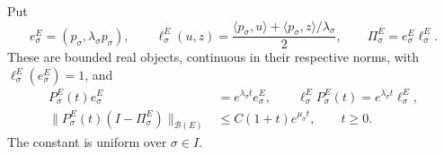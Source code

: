 \begin{proposition}
  \label{P:compact-E-wave}
  Put
  \[
    e_\sigma^E=(p_\sigma,\lambda_\sigma p_\sigma),\qquad
    \ell_\sigma^E(u,z)
    =\frac{\langle p_\sigma,u\rangle+
    \langle p_\sigma,z\rangle/\lambda_\sigma}{2},
    \qquad \Pi_\sigma^E=e_\sigma^E\ell_\sigma^E.
  \]
  These are bounded real objects, continuous in their respective norms,
  with $\ell_\sigma^E(e_\sigma^E)=1$, and
  \begin{align}
    P_\sigma^E(t)e_\sigma^E
    &=e^{\lambda_\sigma t}e_\sigma^E,\qquad
    \ell_\sigma^EP_\sigma^E(t)
    =e^{\lambda_\sigma t}\ell_\sigma^E,\label{E:compact-E-eigen}\\
    \|P_\sigma^E(t)(I-\Pi_\sigma^E)\|_{\mathcal B(E)}
    &\le C(1+t)e^{\mu_\sigma t},\qquad t\ge0.
    \label{E:compact-E-complement}
  \end{align}
  The constant is uniform over $\sigma\in I$.
\end{proposition}

